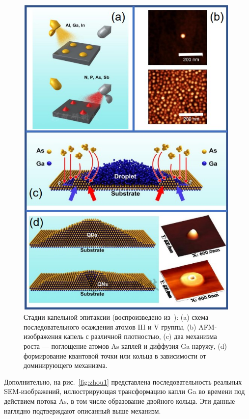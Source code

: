 \documentclass[14pt,oneside]{extarticle}
\begin{document}
\begin{figure}
    \begin{center}
        \includegraphics[width=11cm]{images/gurioli_fig1.png}
        \caption{\label{fig:gurioli1}
            Стадии капельной эпитаксии (воспроизведено из~\cite{gurioli2021}): (a) схема последовательного осаждения атомов III и V группы, (b) AFM-изображения капель с различной плотностью, (c) два механизма роста — поглощение атомов As каплей и диффузия Ga наружу, (d) формирование квантовой точки или кольца в зависимости от доминирующего механизма.}
    \end{center}
\end{figure}

Дополнительно, на рис.~\ref{fig:zhou1} представлена последовательность реальных SEM-изображений, иллюстрирующая трансформацию капли Ga во времени под действием потока As, в том числе образование двойного кольца. Эти данные наглядно подтверждают описанный выше механизм.
\end{document}
